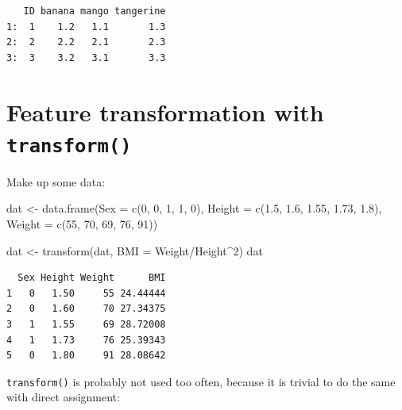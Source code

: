 \documentclass[
]{book}
\newenvironment{Shaded}{\begin{snugshade}}{\end{snugshade}}
\newcommand{\AttributeTok}[1]{\textcolor[rgb]{0.77,0.63,0.00}{#1}}
\newcommand{\DecValTok}[1]{\textcolor[rgb]{0.00,0.00,0.81}{#1}}
\newcommand{\FloatTok}[1]{\textcolor[rgb]{0.00,0.00,0.81}{#1}}
\newcommand{\FunctionTok}[1]{\textcolor[rgb]{0.00,0.00,0.00}{#1}}
\newcommand{\NormalTok}[1]{#1}
\newcommand{\OtherTok}[1]{\textcolor[rgb]{0.56,0.35,0.01}{#1}}
\newcommand{\SpecialCharTok}[1]{\textcolor[rgb]{0.00,0.00,0.00}{#1}}
\begin{document}
\begin{verbatim}
   ID banana mango tangerine
1:  1    1.2   1.1       1.3
2:  2    2.2   2.1       2.3
3:  3    3.2   3.1       3.3
\end{verbatim}

\hypertarget{feature-transformation-with-transform}{%
\section{\texorpdfstring{Feature transformation with \texttt{transform()}}{Feature transformation with transform()}}\label{feature-transformation-with-transform}}

Make up some data:

\begin{Shaded}
\begin{Highlighting}[]
\NormalTok{dat }\OtherTok{\textless{}{-}} \FunctionTok{data.frame}\NormalTok{(}\AttributeTok{Sex =} \FunctionTok{c}\NormalTok{(}\DecValTok{0}\NormalTok{, }\DecValTok{0}\NormalTok{, }\DecValTok{1}\NormalTok{, }\DecValTok{1}\NormalTok{, }\DecValTok{0}\NormalTok{),}
                  \AttributeTok{Height =} \FunctionTok{c}\NormalTok{(}\FloatTok{1.5}\NormalTok{, }\FloatTok{1.6}\NormalTok{, }\FloatTok{1.55}\NormalTok{, }\FloatTok{1.73}\NormalTok{, }\FloatTok{1.8}\NormalTok{),}
                  \AttributeTok{Weight =} \FunctionTok{c}\NormalTok{(}\DecValTok{55}\NormalTok{, }\DecValTok{70}\NormalTok{, }\DecValTok{69}\NormalTok{, }\DecValTok{76}\NormalTok{, }\DecValTok{91}\NormalTok{))}
\end{Highlighting}
\end{Shaded}

\begin{Shaded}
\begin{Highlighting}[]
\NormalTok{dat }\OtherTok{\textless{}{-}} \FunctionTok{transform}\NormalTok{(dat, }\AttributeTok{BMI =}\NormalTok{ Weight}\SpecialCharTok{/}\NormalTok{Height}\SpecialCharTok{\^{}}\DecValTok{2}\NormalTok{)}
\NormalTok{dat}
\end{Highlighting}
\end{Shaded}

\begin{verbatim}
  Sex Height Weight      BMI
1   0   1.50     55 24.44444
2   0   1.60     70 27.34375
3   1   1.55     69 28.72008
4   1   1.73     76 25.39343
5   0   1.80     91 28.08642
\end{verbatim}

\texttt{transform()} is probably not used too often, because it is trivial to do the same with direct assignment:
\end{document}
